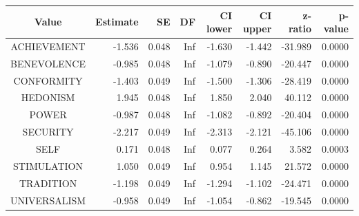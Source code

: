 \begin{table}
\fontsize{12.0pt}{14.4pt}\selectfont
\begin{tabular*}{\linewidth}{@{\extracolsep{\fill}}crrrrrrr}
\toprule
Value & Estimate & SE & DF & CI lower & CI upper & z-ratio & p-value \\ 
\midrule\addlinespace[2.5pt]
ACHIEVEMENT & -1.536 & 0.048 & Inf & -1.630 & -1.442 & -31.989 & 0.0000 \\ 
BENEVOLENCE & -0.985 & 0.048 & Inf & -1.079 & -0.890 & -20.447 & 0.0000 \\ 
CONFORMITY & -1.403 & 0.049 & Inf & -1.500 & -1.306 & -28.419 & 0.0000 \\ 
HEDONISM & 1.945 & 0.048 & Inf & 1.850 & 2.040 & 40.112 & 0.0000 \\ 
POWER & -0.987 & 0.048 & Inf & -1.082 & -0.892 & -20.404 & 0.0000 \\ 
SECURITY & -2.217 & 0.049 & Inf & -2.313 & -2.121 & -45.106 & 0.0000 \\ 
SELF & 0.171 & 0.048 & Inf & 0.077 & 0.264 & 3.582 & 0.0003 \\ 
STIMULATION & 1.050 & 0.049 & Inf & 0.954 & 1.145 & 21.572 & 0.0000 \\ 
TRADITION & -1.198 & 0.049 & Inf & -1.294 & -1.102 & -24.471 & 0.0000 \\ 
UNIVERSALISM & -0.958 & 0.049 & Inf & -1.054 & -0.862 & -19.545 & 0.0000 \\ 
\bottomrule
\end{tabular*}
\end{table}

